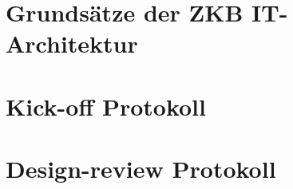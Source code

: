 \documentclass[
11pt, %
a4paper, %
BCOR25mm, %
DIV14, %
footsepline = false, %
headsepline, %
twoside, %
openright,
abstracton, %
listof=totocnumbered, %
bibliography=totocnumbered %
]{scrreprt}
\begin{document}
  

  \cleardoublepage
   
    
  \chapter{Grundsätze der ZKB
  IT-Architektur}\label{chapter:GrundsaetzeDerZkbItArchitektur}
 
  

  \cleardoublepage

 
 
  \chapter{Kick-off Protokoll}\label{chapter:KickOffProtokoll}

  
  
  \cleardoublepage
  
   
  \chapter{Design-review Protokoll}\label{chapter:DesignReviewProtokoll}
  
  
  
  \cleardoublepage
  
  
\end{document}
